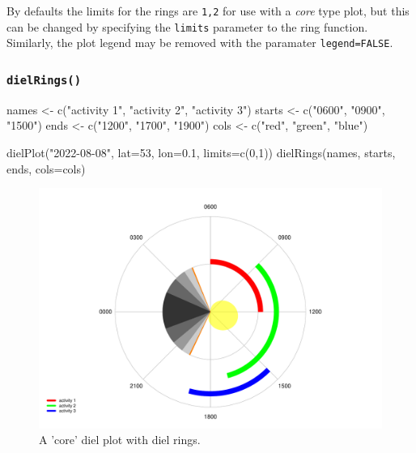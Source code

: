 \documentclass[
]{book}
\newenvironment{Shaded}{\begin{snugshade}}{\end{snugshade}}
\newcommand{\AttributeTok}[1]{\textcolor[rgb]{0.77,0.63,0.00}{#1}}
\newcommand{\DecValTok}[1]{\textcolor[rgb]{0.00,0.00,0.81}{#1}}
\newcommand{\FloatTok}[1]{\textcolor[rgb]{0.00,0.00,0.81}{#1}}
\newcommand{\FunctionTok}[1]{\textcolor[rgb]{0.00,0.00,0.00}{#1}}
\newcommand{\NormalTok}[1]{#1}
\newcommand{\OtherTok}[1]{\textcolor[rgb]{0.56,0.35,0.01}{#1}}
\newcommand{\StringTok}[1]{\textcolor[rgb]{0.31,0.60,0.02}{#1}}
\begin{document}
By defaults the limits for the rings are \texttt{1,2} for use with a \emph{core} type plot, but this can be changed by specifying the \texttt{limits} parameter to the ring function. Similarly, the plot legend may be removed with the paramater \texttt{legend=FALSE}.

\hypertarget{dielrings}{%
\subsubsection{\texorpdfstring{\texttt{dielRings()}}{dielRings()}}\label{dielrings}}

\begin{Shaded}
\begin{Highlighting}[]
\NormalTok{names }\OtherTok{\textless{}{-}} \FunctionTok{c}\NormalTok{(}\StringTok{"activity 1"}\NormalTok{, }\StringTok{"activity 2"}\NormalTok{, }\StringTok{"activity 3"}\NormalTok{)}
\NormalTok{starts }\OtherTok{\textless{}{-}} \FunctionTok{c}\NormalTok{(}\StringTok{"0600"}\NormalTok{, }\StringTok{"0900"}\NormalTok{, }\StringTok{"1500"}\NormalTok{)}
\NormalTok{ends }\OtherTok{\textless{}{-}} \FunctionTok{c}\NormalTok{(}\StringTok{"1200"}\NormalTok{, }\StringTok{"1700"}\NormalTok{, }\StringTok{"1900"}\NormalTok{)}
\NormalTok{cols }\OtherTok{\textless{}{-}} \FunctionTok{c}\NormalTok{(}\StringTok{"red"}\NormalTok{, }\StringTok{"green"}\NormalTok{, }\StringTok{"blue"}\NormalTok{)}

\FunctionTok{dielPlot}\NormalTok{(}\StringTok{"2022{-}08{-}08"}\NormalTok{, }\AttributeTok{lat=}\DecValTok{53}\NormalTok{, }\AttributeTok{lon=}\FloatTok{0.1}\NormalTok{, }\AttributeTok{limits=}\FunctionTok{c}\NormalTok{(}\DecValTok{0}\NormalTok{,}\DecValTok{1}\NormalTok{))}
\FunctionTok{dielRings}\NormalTok{(names, starts, ends, }\AttributeTok{cols=}\NormalTok{cols)}
\end{Highlighting}
\end{Shaded}

\begin{figure}

{\centering \includegraphics[width=0.9\linewidth]{_main_files/figure-latex/diel-plot-rings-1-1} 

}

\caption{A 'core' diel plot with diel rings.}\label{fig:diel-plot-rings-1}
\end{figure}
\end{document}
